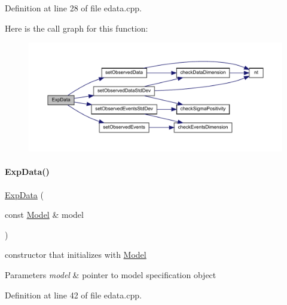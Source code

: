 Definition at line 28 of file edata.\+cpp.

Here is the call graph for this function\+:
\nopagebreak
\begin{figure}[H]
\begin{center}
\leavevmode
\includegraphics[width=350pt]{classamici_1_1_exp_data_a3b747fc65e60e76d84831831eb7b8f49_cgraph}
\end{center}
\end{figure}
\mbox{\label{classamici_1_1_exp_data_af4ce16765488e3857131aa5aea0c38b4}} 
\paragraph{\texorpdfstring{Exp\+Data()}{ExpData()}\hspace{0.1cm}{\footnotesize\ttfamily [5/8]}}
{\footnotesize\ttfamily \mbox{\hyperlink{classamici_1_1_exp_data}{Exp\+Data}} (\begin{DoxyParamCaption}\item[{const \mbox{\hyperlink{classamici_1_1_model}{Model}} \&}]{model }\end{DoxyParamCaption})}

constructor that initializes with \mbox{\hyperlink{classamici_1_1_model}{Model}}


\begin{DoxyParams}{Parameters}
{\em model} & pointer to model specification object \\
\hline
\end{DoxyParams}


Definition at line 42 of file edata.\+cpp.

